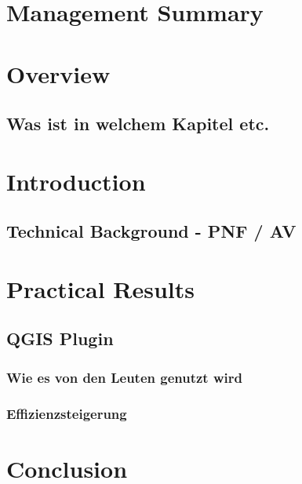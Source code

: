     \chapter{Management Summary}
	\chapter{Overview}
		\section{Was ist in welchem Kapitel etc.}
	
	\chapter{Introduction}
	\section{Technical Background - PNF / AV}
	
    

	

	

	\chapter{Practical Results}
		\section{QGIS Plugin}
		\subsection{Wie es von den Leuten genutzt wird}
		\subsection{Effizienzsteigerung}
	
	\chapter{Conclusion}

	
    

